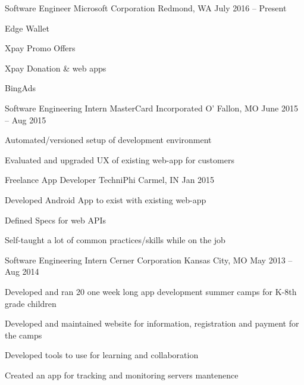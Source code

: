 \documentclass[]{awesome-cv}
\begin{document}
\begin{cventries}
	\cventry
	{Software Engineer}
	{Microsoft Corporation}
	{Redmond, WA}
	{July 2016 – Present}
	{\begin{cvitems}
		\item {Edge Wallet}
		\item {Xpay Promo Offers}
		\item {Xpay Donation \& web apps}
		\item {BingAds} %
	\end{cvitems}}
	\cventry
	{Software Engineering Intern}
	{MasterCard Incorporated}
	{O' Fallon, MO}
	{June 2015 – Aug 2015}
	{\begin{cvitems}
		\item {Automated/versioned setup of development environment}
		\item {Evaluated and upgraded UX of existing web-app for customers}
		\end{cvitems}}
	\cventry
	{Freelance App Developer}
	{TechniPhi}
	{Carmel, IN}
	{Jan 2015}
	{\begin{cvitems}
		\item {Developed Android App to exist with existing web-app}
		\item {Defined Specs for web APIs}
		\item {Self-taught a lot of common practices/skills while on the job} %
		\end{cvitems}}
	\cventry
	{Software Engineering Intern}
	{Cerner Corporation}
	{Kansas City, MO}
	{May 2013 – Aug 2014}
	{\begin{cvitems}
		\item {Developed and ran 20 one week long app development summer camps for K-8th grade children}
		\item {Developed and maintained website for information, registration and payment for the camps}
		\item {Developed tools to use for learning and collaboration}
		\item {Created an app for tracking and monitoring servers mantenence}
		\end{cvitems}}
\end{cventries}

\vspace*{0mm}
\end{document}
